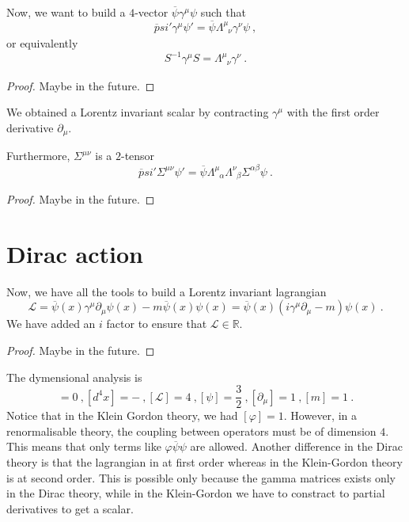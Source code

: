     Now, we want to build a $4$-vector $\overline \psi \gamma^\mu \psi$ such that
    \begin{equation*}
        \overline psi' \gamma^\mu \psi' = \overline \psi \Lambda^\mu_{\phantom \mu \nu} \gamma^\nu \psi ~,
    \end{equation*}
    or equivalently 
    \begin{equation*}
        S^{-1} \gamma^\mu S = \Lambda^\mu_{\phantom \mu \nu} \gamma^\nu ~.
    \end{equation*}
    \begin{proof}
        Maybe in the future.
    \end{proof}

    We obtained a Lorentz invariant scalar by contracting $\gamma^\mu$ with the first order derivative $\partial_\mu$. 

    Furthermore, $\Sigma^{\mu\nu}$ is a $2$-tensor 
    \begin{equation*}
        \overline psi' \Sigma^{\mu\nu} \psi' = \overline \psi \Lambda^\mu_{\phantom \mu \alpha} \Lambda^\nu_{\phantom \nu \beta} \Sigma^{\alpha\beta} \psi ~.
    \end{equation*}
    \begin{proof}
        Maybe in the future.
    \end{proof}

\section{Dirac action}

    Now, we have all the tools to build a Lorentz invariant lagrangian
    \begin{equation*}
        \mathcal L = \overline \psi (x) \gamma^\mu \partial_\mu \psi(x) - m \overline \psi (x) \psi (x) = \overline \psi (x) (i \gamma^\mu \partial_\mu - m) \psi(x) ~.
    \end{equation*}
    We have added an $i$ factor to ensure that $\mathcal L \in \mathbb R$.
    \begin{proof}
        Maybe in the future.
    \end{proof}

    The dymensional analysis is 
    \begin{equation*}
        [S] = 0 ~, [d^4 x] = - ~, [\mathcal L] = 4~, [\psi] = \frac{3}{2} ~, [\partial_\mu] = 1 ~, [m] = 1 ~.
    \end{equation*}
    Notice that in the Klein Gordon theory, we had $[\varphi] = 1$. However, in a renormalisable theory, the coupling between operators must be of dimension $4$. This means that only terms like $\varphi \overline \psi \psi$ are allowed. Another difference in the Dirac theory is that the lagrangian in at first order whereas in the Klein-Gordon theory is at second order. This is possible only because the gamma matrices exists only in the Dirac theory, while in the Klein-Gordon we have to constract to partial derivatives to get a scalar.

